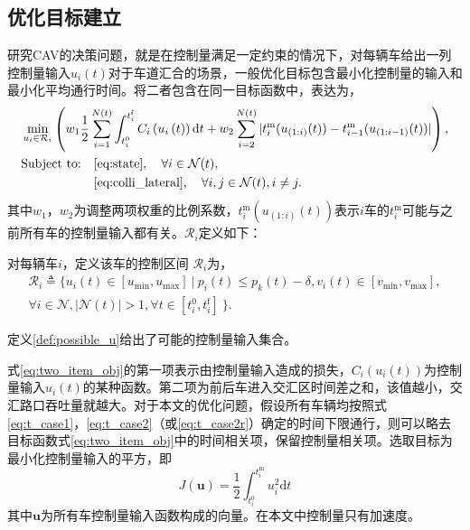\subsection{优化目标建立}
研究CAV的决策问题，就是在控制量满足一定约束的情况下，对每辆车给出一列控制量输入$u_i(t)$对于车道汇合的场景，一般优化目标包含最小化控制量的输入和最小化平均通行时间。\cite{Rios2016Automated}将二者包含在同一目标函数中，表达为，
\begin{equation}
\begin{aligned}
&\min_{u_i\in \mathcal{R}_i}\left(w_1\frac12\sum^{N(t)}_{i=1}\int_{t_i^0}^{t_i^\mathrm{f}}C_i\left(u_i\left(t\right)\right)\mathrm{d}t + w_2\sum_{i=2}^{N(t)}|t_i^\mathrm{m}(u_{(1:i)}(t))-t_{i-1}^\mathrm{m}(u_{(1:i-1)}(t))|\right),\\
&
\begin{aligned}
\text{Subject to:} & \quad \mbox{\ref{eq:state}}, \quad \forall i\in \mathcal{N}(t),\\
& \quad \mbox{\ref{eq:colli_lateral}}, \quad \forall i,j \in \mathcal{N}(t), i\neq j.
\end{aligned}
\end{aligned}
\label{eq:two_item_obj}
\end{equation}
其中$w_1$，$w_2$为调整两项权重的比例系数，$t_i^\mathrm{m}(u_{(1:i)}(t))$表示$i$车的$t_i^\mathrm{m}$可能与之前所有车的控制量输入都有关。$\mathcal{R}_i$定义如下：
\begin{definition}[控制区间]
对每辆车$i$，定义该车的{\heiti 控制区间} $\mathcal{R}_i$为，
\begin{equation}
\begin{gathered}
\mathcal{R}_i\triangleq\{u_i(t)\in[u_{\min}, u_{\max}]\ |\ p_i(t)\leq p_k(t)-\delta, v_i(t)\in[v_{\min}, v_{\max}],\\
\forall i \in \mathcal{N}, |\mathcal{N}(t)|>1, \forall t \in [t_i^0, t_i^\mathrm{f}]\ \}.
\end{gathered}
\end{equation}
\label{def:possible_u}
\end{definition}
定义\ref{def:possible_u}给出了可能的控制量输入集合。

式\ref{eq:two_item_obj}的第一项表示由控制量输入造成的损失，$C_i(u_i(t))$为控制量输入$u_i(t)$的某种函数。第二项为前后车进入交汇区时间差之和，该值越小，交汇路口吞吐量就越大。对于本文的优化问题，假设所有车辆均按照式\ref{eq:t_case1}，\ref{eq:t_case2}（或\ref{eq:t_case2r}）确定的时间下限通行，则可以略去目标函数式\ref{eq:two_item_obj}中的时间相关项，保留控制量相关项。选取目标为最小化控制量输入的平方\cite{Malikopoulos2016A,Rios2016Automated}，即
\begin{equation}
J(\bm{u})=\frac12\int_{t_i^0}^{t_i^\mathrm{m}}u_i^2\mathrm{d}t
\label{eq:one_item_obj}
\end{equation}
其中$\bm{u}$为所有车控制量输入函数构成的向量。在本文中控制量只有加速度。